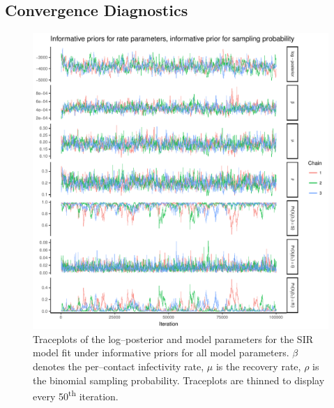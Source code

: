 \subsection{Convergence Diagnostics}
\begin{figure}[htbp]
	\centering
	\includegraphics[width=0.9\linewidth]{figures/informative_informative_traceplots.pdf}
	\caption[Simuation 4 MCMC traceplots for SIR model parameters fit under informative priors for all parameters.]{Traceplots of the log--posterior and model parameters for the SIR model fit under informative priors for all model parameters. $ \beta $ denotes the per--contact infectivity rate, $ \mu $ is the recovery rate, $ \rho $ is the binomial sampling probability. Traceplots are thinned to display every 50\textsuperscript{th} iteration.}
	\label{fig:inform_inform_traces}
\end{figure}

